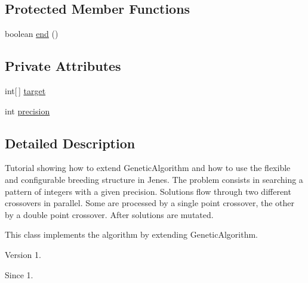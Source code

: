 \subsection*{Protected Member Functions}
\begin{DoxyCompactItemize}
\item 
boolean \hyperlink{classjenes_1_1tutorials_1_1old_1_1problem2_1_1_pattern_g_a_a4c05b8a32518e4fe78f66e2576014bd9}{end} ()
\end{DoxyCompactItemize}
\subsection*{Private Attributes}
\begin{DoxyCompactItemize}
\item 
int\mbox{[}$\,$\mbox{]} \hyperlink{classjenes_1_1tutorials_1_1old_1_1problem2_1_1_pattern_g_a_a56ecbd12f7e7af3887699cc99be1fd24}{target}
\item 
int \hyperlink{classjenes_1_1tutorials_1_1old_1_1problem2_1_1_pattern_g_a_a66b0ced66757ac14afd2648465ba253f}{precision}
\end{DoxyCompactItemize}


\subsection{Detailed Description}
Tutorial showing how to extend {\ttfamily Genetic\-Algorithm} and how to use the flexible and configurable breeding structure in Jenes. The problem consists in searching a pattern of integers with a given precision. Solutions flow through two different crossovers in parallel. Some are processed by a single point crossover, the other by a double point crossover. After solutions are mutated.

This class implements the algorithm by extending {\ttfamily Genetic\-Algorithm}.

\begin{DoxyVersion}{Version}
1.
\end{DoxyVersion}
\begin{DoxySince}{Since}
1. 
\end{DoxySince}


